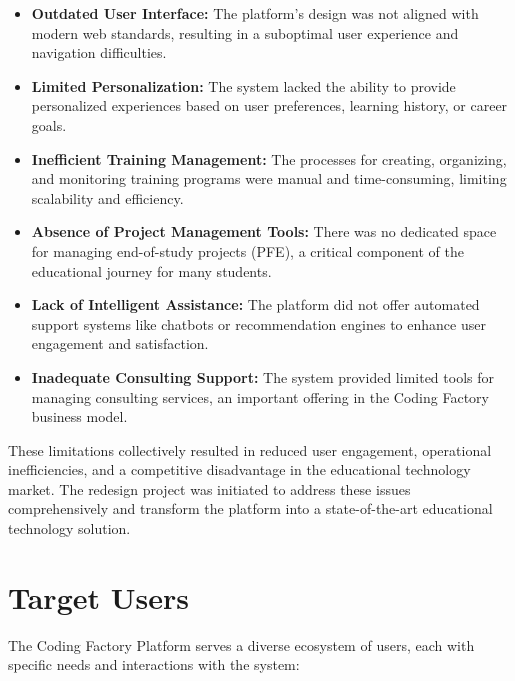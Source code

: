 \documentclass[12pt,a4paper]{report}
\begin{document}
\begin{itemize}
    \item \textbf{Outdated User Interface:} The platform's design was not aligned with modern web standards, resulting in a suboptimal user experience and navigation difficulties.

    \item \textbf{Limited Personalization:} The system lacked the ability to provide personalized experiences based on user preferences, learning history, or career goals.

    \item \textbf{Inefficient Training Management:} The processes for creating, organizing, and monitoring training programs were manual and time-consuming, limiting scalability and efficiency.

    \item \textbf{Absence of Project Management Tools:} There was no dedicated space for managing end-of-study projects (PFE), a critical component of the educational journey for many students.

    \item \textbf{Lack of Intelligent Assistance:} The platform did not offer automated support systems like chatbots or recommendation engines to enhance user engagement and satisfaction.

    \item \textbf{Inadequate Consulting Support:} The system provided limited tools for managing consulting services, an important offering in the Coding Factory business model.
\end{itemize}

These limitations collectively resulted in reduced user engagement, operational inefficiencies, and a competitive disadvantage in the educational technology market. The redesign project was initiated to address these issues comprehensively and transform the platform into a state-of-the-art educational technology solution.

\section{Target Users}
The Coding Factory Platform serves a diverse ecosystem of users, each with specific needs and interactions with the system:
\end{document}
